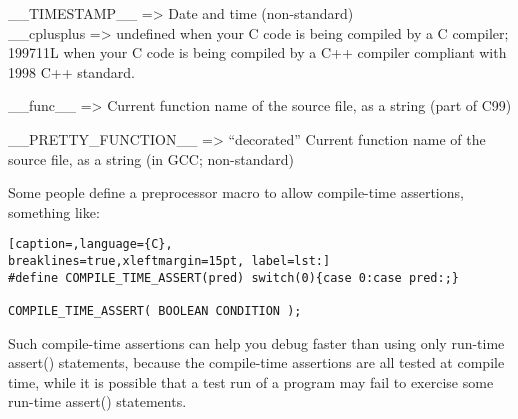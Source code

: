 \_\_TIMESTAMP\_\_ =\textgreater{} Date and time (non-standard)\\

\_\_cplusplus =\textgreater{} undefined when your C code is being compiled by a C compiler; 199711L when your C code is being compiled by a C++ compiler compliant with 1998 C++ standard.

\_\_func\_\_ =\textgreater{} Current function name of the source file, as a string (part of C99)

\_\_PRETTY\_FUNCTION\_\_ =\textgreater{} ``decorated'' Current function name of the source file, as a string (in GCC; non-standard)


Some people define a preprocessor macro to allow compile-time assertions,
something like:
\lstset{basicstyle=\scriptsize, numbers=left, captionpos=b, tabsize=4}
\begin{lstlisting}[caption=,language={C},
breaklines=true,xleftmargin=15pt, label=lst:]
#define COMPILE_TIME_ASSERT(pred) switch(0){case 0:case pred:;}

COMPILE_TIME_ASSERT( BOOLEAN CONDITION );
\end{lstlisting}

Such compile-time assertions can help you debug faster than using only run-time
assert() statements, because the compile-time assertions are all tested at
compile time, while it is possible that a test run of a program may fail to
exercise some run-time assert() statements.
